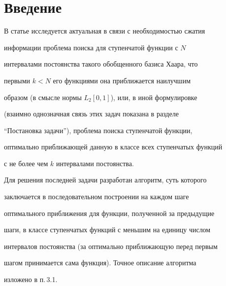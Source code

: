 

\maketitle


\label{begin}











\section{Введение}





В статье исследуется актуальная в связи с необходимостью сжатия


информации проблема поиска для ступенчатой функции с $N$


интервалами постоянства такого обобщенного базиса Хаара, что


первыми $k<N$ его функциями она приближается наилучшим


образом (в смысле нормы $L_2[0,1]$), или, в иной формулировке


(взаимно однозначная связь этих задач показана в разделе


``Постановка задачи''), проблема поиска ступенчатой функции,


оптимально приближающей данную в классе всех ступенчатых функций


с не более чем $k$ интервалами постоянства.





Для решения последней задачи разработан алгоритм, суть которого


заключается в последовательном построении на каждом шаге


оптимального приближения для функции, полученной за предыдущие


шаги, в классе ступенчатых функций с меньшим на единицу числом


интервалов постоянства (за оптимально приближающую перед первым


шагом принимается сама функция). Точное описание алгоритма


изложено в п.\,3.1.






